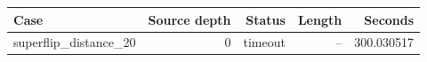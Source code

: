 {\small
\begin{tabular}{lrrrr}
\hline
Case & Source depth & Status & Length & Seconds \\
\hline
superflip\_distance\_20 & 0 & timeout & -- & 300.030517 \\
\hline
\end{tabular}
}
